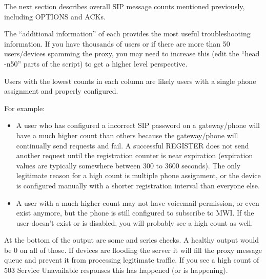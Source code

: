 \documentclass[letterpaper,10pt,english]{sphinxmanual}
\begin{document}
The next section describes overall SIP message counts mentioned previously, including OPTIONS and ACKs.

The “additional information” of each provides the most useful troubleshooting information.
If you have thousands of users or if there are more than 50 users/devices spamming the proxy, you may need to increase this (edit the “head -n50” parts of the script) to get a higher level perspective.

Users with the lowest counts in each column are likely users with a single phone assignment and properly configured. 

For example:
\begin{itemize}
\item {} 
A user who has configured a incorrect SIP password on a gateway/phone will have a much higher  count than others because the gateway/phone will continually send requests and fail.
A successful REGISTER does not send another request until the registration counter is near expiration (expiration values are typically somewhere between 300 to 3600 seconds).
The only legitimate reason for a high  count is multiple phone assignment, or the device is configured manually with a shorter registration interval than everyone else.

\item {} 
A user with a much higher  count may not have voicemail permission, or even exist anymore, but the phone is still configured to subscribe to MWI.
If the user doesn’t exist or is disabled, you will probably see a high  count as well.

\end{itemize}

At the bottom of the output are some 
and  series checks. A healthy output would be 0 on all of those.
If devices are flooding the server it will fill the proxy message queue and prevent it from processing legitimate traffic.
If you see a high count of 503 Service Unavailable responses this has happened (or is happening).
\end{document}
